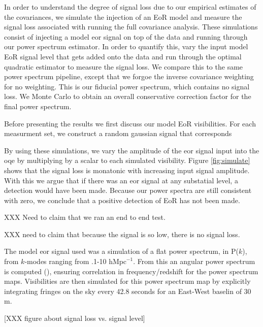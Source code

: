 \documentclass[twocolumn,numberedappendix]{emulateapj} \shorttitle{PSA64}
\begin{document}
In order to understand the degree of signal loss due to our empirical estimates
of the covariances, we simulate the injection of an EoR model and measure the
signal loss associated with running the full covariance analysis. These
simulations consist of injecting a model eor signal on top of the data and
running through our power spectrum estimator. In order to quantify this, vary
the input model EoR signal level that gets added onto the data and run through
the optimal quadratic estimator to measure the signal loss. We compare this to
the same power spectrum pipeline, except that we forgoe the inverse covariance
weighting for no weighting. This is our fiducial power spectrum, which contains
no signal loss. We Monte Carlo to obtain an overall conservative correction
factor for the final power spectrum. 

Before presenting the results we first discuss our model EoR visibilities. For
each measurment set, we construct a random gaussian signal that corresponds 

By using these simulations, we vary the amplitude of the eor signal input into
the oqe by multiplying by a scalar to each simulated visibility. Figure
\ref{fig:simulate} shows that the signal loss is monatonic with increasing
input signal amplitude. With this we argue that if there was an eor signal at
any substatial level, a detection would have been made. Because our power
spectra are still consistent with zero, we conclude that a positive detection of
EoR has not been made. 



XXX Need to claim that we ran an end to end test.

XXX need to claim that because the signal is so low, there is no signal loss.

The model eor signal used was a simulation of a flat power spectrum, in P($k$),
from $k$-modes ranging from .1-10 $\text{hMpc}^{-1}$. From this an angular power
spectrum is computed (\cite{datta_et_al2007, lewis_challinor_2007}), ensuring
correlation in frequency/redshift for the power spectrum maps. Visibilities are
then simulated for this power spectrum map by explicitly integrating fringes on
the sky every 42.8 seconds for an East-West baselin of 30 m.

[XXX figure about signal loss vs. signal level]
\end{document}
